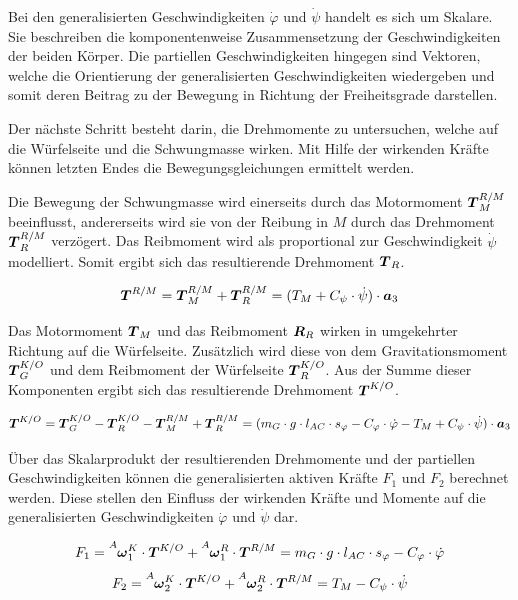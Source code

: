 Bei den generalisierten Geschwindigkeiten $\dot{\varphi}$ und $\dot{\psi}$ handelt es sich um Skalare. Sie beschreiben die komponentenweise Zusammensetzung der Geschwindigkeiten der beiden Körper. Die partiellen Geschwindigkeiten hingegen sind Vektoren, welche die Orientierung der generalisierten Geschwindigkeiten wiedergeben und somit deren Beitrag zu der Bewegung in Richtung der Freiheitsgrade darstellen.

Der nächste Schritt besteht darin, die Drehmomente zu untersuchen, welche auf die Würfelseite und die Schwungmasse wirken. Mit Hilfe der wirkenden Kräfte können letzten Endes die Bewegungsgleichungen ermittelt werden.

Die Bewegung der Schwungmasse wird einerseits durch das Motormoment $\boldsymbol{T}^{R/M}_M$ beeinflusst, andererseits wird sie von der Reibung in $M$ durch das Drehmoment $\boldsymbol{T}^{R/M}_R$ verzögert. Das Reibmoment wird als proportional zur Geschwindigkeit $\dot{\psi}$ modelliert. Somit ergibt sich das resultierende Drehmoment $\boldsymbol{T}_R$.

\begin{equation}
\boldsymbol{T}^{R/M} = \boldsymbol{T}^{R/M}_M + \boldsymbol{T}^{R/M}_R = (T_M + C_{\psi} \cdot \dot{\psi})\cdot \boldsymbol{a}_3
\end{equation}

Das Motormoment $\boldsymbol{T}_M$ und das Reibmoment $\boldsymbol{R}_R$ wirken in umgekehrter Richtung auf die Würfelseite. Zusätzlich wird diese von dem Gravitationsmoment $\boldsymbol{T}^{K/O}_G$ und dem Reibmoment der Würfelseite $\boldsymbol{T}^{K/O}_R$. Aus der Summe dieser Komponenten ergibt sich das resultierende Drehmoment $\boldsymbol{T}^{K/O}$.

\begin{equation}
\boldsymbol{T}^{K/O} = \boldsymbol{T}^{K/O}_G - \boldsymbol{T}^{K/O}_R - \boldsymbol{T}^{R/M}_M + \boldsymbol{T}^{R/M}_R = 
(m_G \cdot g \cdot l_{AC} \cdot s_{\varphi} - C_{\varphi} \cdot \dot{\varphi} - T_M + C_{\psi} \cdot \dot{\psi}) \cdot \boldsymbol{a}_3
\end{equation}

Über das Skalarprodukt der resultierenden Drehmomente und der partiellen Geschwindigkeiten können die generalisierten aktiven Kräfte $F_1$ und $F_2$ berechnet werden. Diese stellen den Einfluss der wirkenden Kräfte und Momente auf die generalisierten Geschwindigkeiten $\dot{\varphi}$ und $\dot{\psi}$ dar.

\begin{equation}
F_1 = \vel{A}{\bs{\omega}}{K}_1 \cdot \bs{T}^{K/O} + \vel{A}{\bs{\omega}}{R}_1 \cdot \bs{T}^{R/M}= m_G \cdot g \cdot l_{AC} \cdot s_{\varphi} - C_{\varphi} \cdot \dot{\varphi}
\end{equation}
\begin{equation}
F_2 = \vel{A}{\bs{\omega}}{K}_2 \cdot \bs{T}^{K/O} + \vel{A}{\bs{\omega}}{R}_2 \cdot \bs{T}^{R/M}= T_M - C_{\psi} \cdot {\dot{\psi}}
\end{equation}

